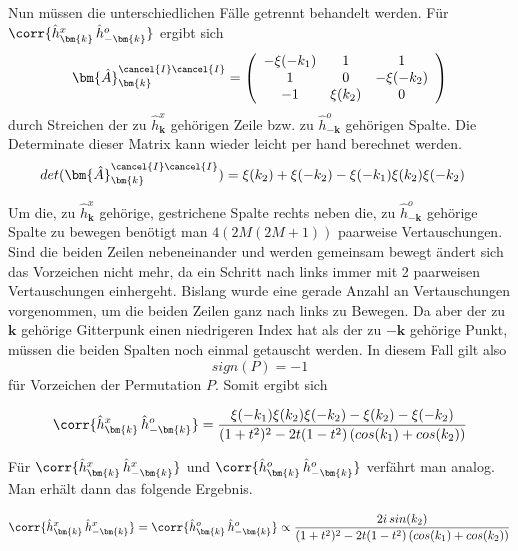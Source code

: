 \noindent Nun müssen die unterschiedlichen Fälle getrennt behandelt werden. Für $\corr{\hat{h}_{\bm{k}}^x\, \hat{h}_{-\bm{k}}^o} $ ergibt sich 
\begin{equation} 
    \bm{\hat{A}}_{\bm{k}}^{\cancel{I} \cancel{I}} = \left(\begin{array}{ccc} 
        -\xi(-k_1)  &  1       & 1        \\
        1        &  0       & -\xi(-k_2)  \\
        -1        &\xi(k_2)&  0        \\
    \end{array}\right) 
\end{equation}
durch Streichen der zu $\hat{h}_{\bm{k}}^x$ gehörigen Zeile bzw. zu $\hat{h}_{\bm{-k}}^o$ gehörigen Spalte.
Die Determinate dieser Matrix kann wieder leicht per hand berechnet werden.
\begin{align} \label{eq: det A_K_II HxHo}
    det(\bm{\hat{A}}_{\bm{k}}^{\cancel{I} \cancel{I}}) &= 
    \xi(k_2) + \xi(-k_2) - \xi(-k_1)\xi(k_2)\xi(-k_2)    
\end{align}

\noindent Um die, zu $\hat{h}_{\bm{k}}^x$ gehörige,  gestrichene Spalte rechts neben die, zu $\hat{h}_{\bm{-k}}^o$ gehörige Spalte zu bewegen benötigt man $4(2M(2M+1))$ paarweise Vertauschungen. Sind die beiden Zeilen nebeneinander und werden gemeinsam bewegt ändert sich das Vorzeichen nicht mehr, da ein Schritt nach links immer mit 2 paarweisen Vertauschungen einhergeht. Bislang wurde eine gerade Anzahl an Vertauschungen vorgenommen, um die beiden Zeilen ganz nach links zu Bewegen. Da aber der zu $\bm{k}$ gehörige Gitterpunk einen niedrigeren Index hat als der zu $-\bm{k}$ gehörige Punkt, müssen die beiden Spalten noch einmal getauscht werden. In diesem Fall gilt also 
$$sign(P) =  -1$$
für Vorzeichen der Permutation $P$. Somit ergibt sich 
\begin{grayframe}[frametitle = {Horizontale Graßmann-Paar-Korrelation im K-Raum}]
\begin{equation} \label{eq: expl grassmann_pair_corr}
\corr{\hat{h}_{\bm{k}}^x\, \hat{h}_{-\bm{k}}^o} = \frac{\xi(-k_1)\xi(k_2)\xi(-k_2) -\xi(k_2) - \xi(-k_2)}{(1+t^2)^2 - 2t(1-t^2)\,(cos(k_1) + cos(k_2))} 
\end{equation}
\end{grayframe}
\noindent Für $\corr{\hat{h}_{\bm{k}}^x\, \hat{h}_{-\bm{k}}^x} $ und $\corr{\hat{h}_{\bm{k}}^o\, \hat{h}_{-\bm{k}}^o} $ verfährt man analog. Man erhält dann das folgende Ergebnis.
\begin{grayframe}
\begin{equation} \label{eq: expl grassmann_pair_corr 0}
\corr{\hat{h}_{\bm{k}}^x\, \hat{h}_{-\bm{k}}^x} = \corr{\hat{h}_{\bm{k}}^o\, \hat{h}_{-\bm{k}}^o} \propto \frac{2i\,sin(k_2)}{(1+t^2)^2 - 2t(1-t^2)\,(cos(k_1) + cos(k_2))} 
\end{equation}
\end{grayframe}

